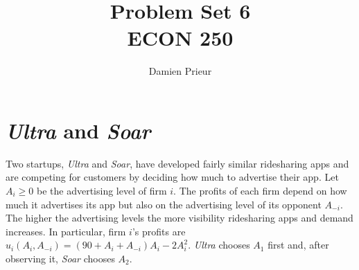 \documentclass{article}
\author{Damien Prieur}
\title{Problem Set 6 \\ ECON 250}
\date{}
\begin{document}
\maketitle

\section{\emph{Ultra} and \emph{Soar}}
Two startups, \emph{Ultra} and \emph{Soar}, have developed fairly similar ridesharing apps and are competing for customers by deciding how much to advertise their app.
Let $A_{i} \ge 0$ be the advertising level of firm $i$.
The profits of each firm depend on how much it advertises its app but also on the advertising level of its opponent $A_{-i}$.
The higher the advertising levels the more visibility ridesharing apps and demand increases.
In particular, firm $i$'s profits are $u_{i}(A_{i},A_{-i}) = (90 + A_{i} + A_{-i})A_{i}-2A_{i}^{2}$.
\emph{Ultra} chooses $A_{1}$ first and, after observing it, \emph{Soar} chooses $A_{2}$.
\end{document}
